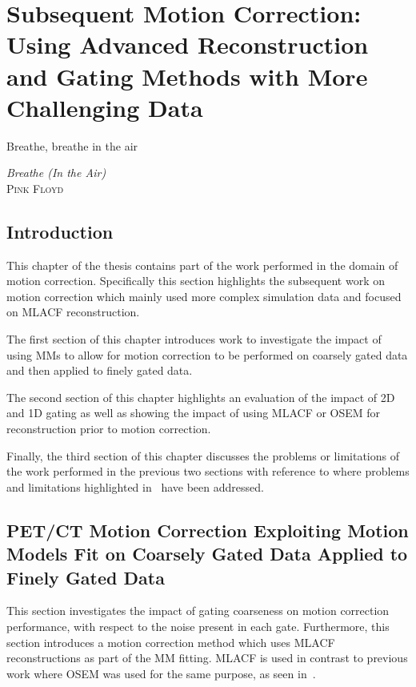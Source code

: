 \chapter{Subsequent Motion Correction: Using Advanced Reconstruction and Gating Methods with More Challenging Data} \label{sec:subsequent_motion_correction_using_advanced_reconstruction_and_gating_methods_with_more_challenging_data}
    \vspace*{\fill}
    \setlength{\epigraphwidth}{0.3\linewidth}
    \renewcommand{\epigraphflush}{flushright}
    \renewcommand{\epigraphsize}{\footnotesize}
    \epigraph{Breathe, breathe in the air}%
              {\textit{Breathe (In the Air)}\\ \textsc{Pink Floyd}}
    
    \newpage
    
    \section{Introduction} \label{sec:subsequent_motion_correction_using_advanced_reconstruction_and_gating_methods_with_more_challenging_data_introduction}
        This chapter of the thesis contains part of the work performed in the domain of motion correction. Specifically this section highlights the subsequent work on motion correction which mainly used more complex simulation data and focused on \gls{MLACF} reconstruction.
        
        The first section of this chapter introduces work to investigate the impact of using \glspl{MM} to allow for motion correction to be performed on coarsely gated data and then applied to finely gated data.
        
        The second section of this chapter highlights an evaluation of the impact of \gls{2D} and \gls{1D} gating as well as showing the impact of using \gls{MLACF} or \gls{OSEM} for reconstruction prior to motion correction.
        
        Finally, the third section of this chapter discusses the problems or limitations of the work performed in the previous two sections with reference to where problems and limitations highlighted in~ have been addressed.
    
    \section{PET/CT Motion Correction Exploiting Motion Models Fit on Coarsely Gated Data Applied to Finely Gated Data} \label{sec:pet_ct_motion_correction_exploiting_motion_models_fit_on_coarsely_gated_data_applied_to_finely_gated_data}
        This section investigates the impact of gating coarseness on motion correction performance, with respect to the noise present in each gate. Furthermore, this section introduces a motion correction method which uses \gls{MLACF} reconstructions as part of the \gls{MM} fitting. \gls{MLACF} is used in contrast to previous work where \gls{OSEM} was used for the same purpose, as seen in~.

